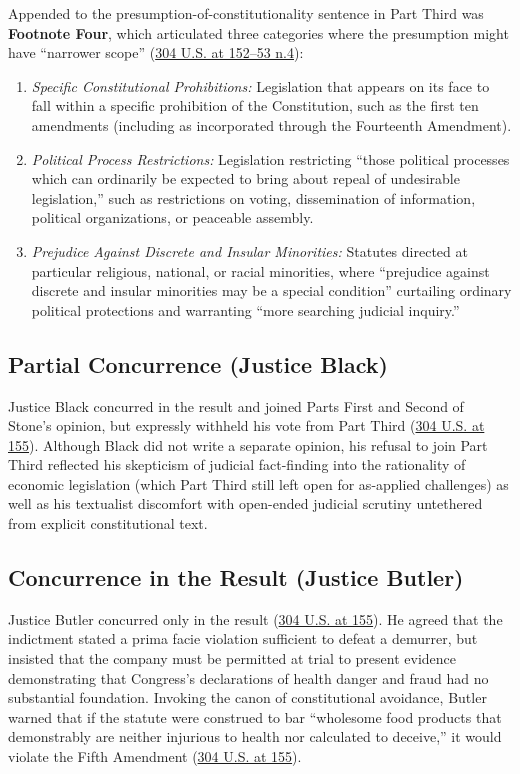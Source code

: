 \documentclass[12pt]{article}
\begin{document}
Appended to the presumption-of-constitutionality sentence in Part Third was \textbf{Footnote Four}, which articulated three categories where the presumption might have ``narrower scope'' (\href{https://supreme.justia.com/cases/federal/us/304/144/}{304 U.S. at 152--53 n.4}):
\begin{enumerate}
    \item \textit{Specific Constitutional Prohibitions:} Legislation that appears on its face to fall within a specific prohibition of the Constitution, such as the first ten amendments (including as incorporated through the Fourteenth Amendment).
    \item \textit{Political Process Restrictions:} Legislation restricting ``those political processes which can ordinarily be expected to bring about repeal of undesirable legislation,'' such as restrictions on voting, dissemination of information, political organizations, or peaceable assembly.
    \item \textit{Prejudice Against Discrete and Insular Minorities:} Statutes directed at particular religious, national, or racial minorities, where ``prejudice against discrete and insular minorities may be a special condition'' curtailing ordinary political protections and warranting ``more searching judicial inquiry.''
\end{enumerate}

\subsection{Partial Concurrence (Justice Black)}

Justice Black concurred in the result and joined Parts First and Second of Stone's opinion, but expressly withheld his vote from Part Third (\href{https://supreme.justia.com/cases/federal/us/304/144/}{304 U.S. at 155}). Although Black did not write a separate opinion, his refusal to join Part Third reflected his skepticism of judicial fact-finding into the rationality of economic legislation (which Part Third still left open for as-applied challenges) as well as his textualist discomfort with open-ended judicial scrutiny untethered from explicit constitutional text.

\subsection{Concurrence in the Result (Justice Butler)}

Justice Butler concurred only in the result (\href{https://supreme.justia.com/cases/federal/us/304/144/}{304 U.S. at 155}). He agreed that the indictment stated a prima facie violation sufficient to defeat a demurrer, but insisted that the company must be permitted at trial to present evidence demonstrating that Congress's declarations of health danger and fraud had no substantial foundation. Invoking the canon of constitutional avoidance, Butler warned that if the statute were construed to bar ``wholesome food products that demonstrably are neither injurious to health nor calculated to deceive,'' it would violate the Fifth Amendment (\href{https://supreme.justia.com/cases/federal/us/304/144/}{304 U.S. at 155}).
\end{document}
